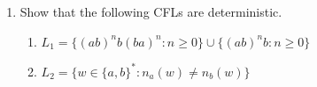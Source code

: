 \documentclass[12pt]{article}
\begin{document}
\begin{spacing}{1.5}
\begin{enumerate}
\begin{enumerate}
                  \end{enumerate}
                  \newpage
            \item[5.] [20 Points] Show that the following CFLs are deterministic.
                  \begin{enumerate}
                        \item[(a)] $L_1=\{(ab)^nb(ba)^n : n \geq 0 \} \cup \{(ab)^nb : n \geq 0 \}$

                        \item[(b)] $L_2=\{w \in \{a,b \}^* : n_a(w) \not= n_b(w) \}$

                  \end{enumerate}

      \end{enumerate}

\end{spacing}
\end{document}
